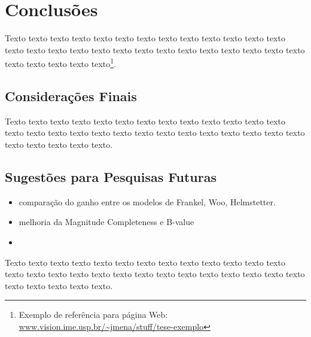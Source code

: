 \chapter{Conclusões}
\label{cap:conclusoes}

Texto texto texto texto texto texto texto texto texto texto texto texto texto
texto texto texto texto texto texto texto texto texto texto texto texto texto
texto texto texto texto texto texto\footnote{Exemplo de referência para página
Web: \url{www.vision.ime.usp.br/~jmena/stuff/tese-exemplo}}.

\section{Considerações Finais} 

Texto texto texto texto texto texto texto texto texto texto texto texto texto
texto texto texto texto texto texto texto texto texto texto texto texto texto
texto texto texto texto texto texto. 

\section{Sugestões para Pesquisas Futuras} 


\begin{itemize}
	\item comparação do ganho entre os modelos de Frankel, Woo, Helmstetter.
	\item melhoria da Magnitude Completeness e B-value
	\item 
\end{itemize}

Texto texto texto texto texto texto texto texto texto texto texto texto texto
texto texto texto texto texto texto texto texto texto texto texto texto texto
texto texto texto texto texto texto.

